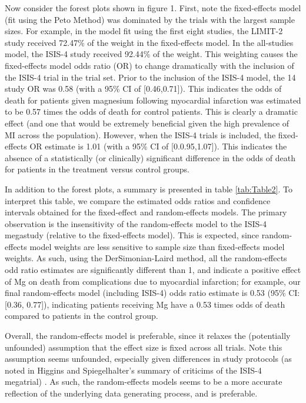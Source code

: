 \documentclass[fleqn,10pt]{SelfArx} %
\begin{document}
Now consider the forest plots shown in figure 1. First, note the fixed-effects model (fit using the Peto Method) was dominated by the trials with the largest sample sizes. For example, in the model fit using the first eight studies, the LIMIT-2 study received 72.47\% of the weight in the fixed-effects model. In the all-studies model, the ISIS-4 study received 92.44\% of the weight. This weighting causes the fixed-effects model odds ratio (OR) to change dramatically with the inclusion of the ISIS-4 trial in the trial set. Prior to the inclusion of the ISIS-4 model, the 14 study OR was 0.58 (with a 95\% CI of [0.46,0.71]). This indicates the odds of death for patients given magnesium following myocardial infarction was estimated to be 0.57 times the odds of death for control patients. This is clearly a dramatic effect (and one that would be extremely beneficial given the high prevalence of MI across the population). However, when the ISIS-4 trials is included, the fixed-effects OR estimate is 1.01 (with a 95\% CI of [0.0.95,1.07]). This indicates the absence of a statistically (or clinically) significant difference in the odds of death for patients in the treatment versus control groups.

In addition to the forest plots, a summary is presented in table \ref{tab:Table2}.  To interpret this table, we compare the estimated odds ratios and confidence intervals obtained for the fixed-effect and random-effects models. The primary observation is the insensitivity of the random-effects model to the ISIS-4 megastudy (relative to the fixed-effects model). This is expected, since random-effects model weights are less sensitive to sample size than fixed-effects model weights. As such, using the DerSimonian-Laird method, all the random-effects odd ratio estimates are significantly different than 1, and indicate a positive effect of Mg on death from complications due to myocardial infarction; for example, our final random-effects model (including ISIS-4) odds ratio estimate is 0.53 (95\% CI: [0.36, 0.77]), indicating patients receiving Mg have a 0.53 times odds of death compared to patients in the control group.

Overall, the random-effects model is preferable, since it relaxes the (potentially unfounded) assumption that the effect size is fixed across all trials. Note this assumption seems unfounded, especially given differences in study protocols (as noted in Higgins and Spiegelhalter's summary of criticims of the ISIS-4 megatrial) \cite{Original}. As such, the random-effects models seems to be a more accurate reflection of the underlying data generating process, and is preferable.
\end{document}
